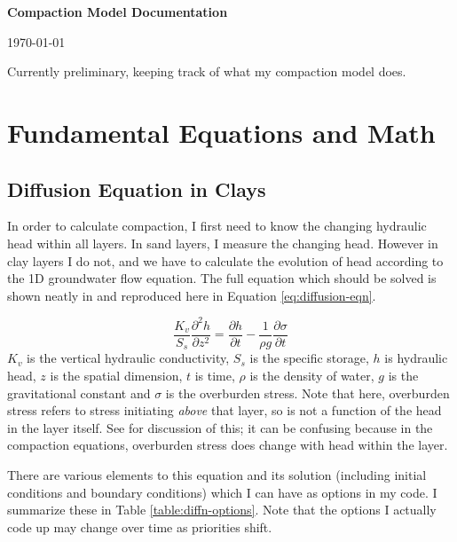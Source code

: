 \documentclass{article}
\begin{document}
\LARGE\textbf{Compaction Model Documentation}
\normalsize

\today
\author{Matt Lees}

\abstract Currently preliminary, keeping track of what my compaction model does.


\tableofcontents

\section{Fundamental Equations and Math}

\subsection{Diffusion Equation in Clays}
\label{sec:diffusion}

In order to calculate compaction, I first need to know the changing hydraulic head within all layers. In sand layers, I measure the changing head. However in clay layers I do not, and we have to calculate the evolution of head according to the 1D groundwater flow equation. The full equation which should be solved is shown neatly in \cite{helm_one-dimensional_1975} and reproduced here in Equation \ref{eq:diffusion-eqn}.

\begin{equation}
\frac{K_v}{S_s} \frac{\partial^2h}{\partial z^2} = \frac{\partial h}{\partial t} - \frac{1}{\rho g} \frac{\partial \sigma}{\partial t}
\label{eq:diffusion-eqn}
\end{equation}
$K_v$ is the vertical hydraulic conductivity, $S_s$ is the specific storage, $ h$ is hydraulic head, $z$ is the spatial dimension, $ t$ is time, $ \rho$ is the density of water, $ g $ is the gravitational constant and $\sigma$ is the overburden stress. Note that here, overburden stress refers to stress initiating \textit{above} that layer, so is not a function of the head in the layer itself. See \cite{helm_one-dimensional_1975} for discussion of this; it can be confusing because in the compaction equations, overburden stress does change with head within the layer.

There are various elements to this equation and its solution (including initial conditions and boundary conditions) which I can have as options in my code. I summarize these in Table \ref{table:diffn-options}. Note that the options I actually code up may change over time as priorities shift.
\end{document}
